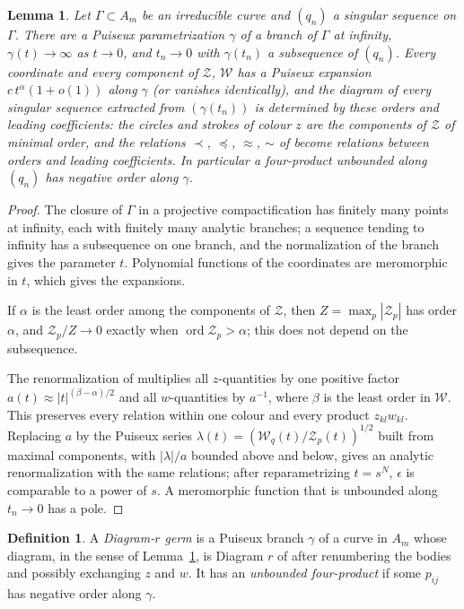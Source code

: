 \documentclass[11pt]{amsart}
\newtheorem{lemma}[theorem]{Lemma}
\theoremstyle{definition}
\newtheorem{definition}[theorem]{Definition}
\theoremstyle{remark}
\newcommand{\ord}{\operatorname{ord}}
\begin{document}
\begin{lemma}\label{lem:germ}
Let $\Gamma\subset A_m$ be an irreducible curve and $(q_n)$ a singular sequence on $\Gamma$.  There
are a Puiseux parametrization $\gamma$ of a branch of $\Gamma$ at infinity, $\gamma(t)\to\infty$ as
$t\to 0$, and $t_n\to0$ with $\gamma(t_n)$ a subsequence of $(q_n)$.  Every coordinate and every
component of $\mathcal Z$, $\mathcal W$ has a Puiseux expansion $c\,t^{\alpha}(1+o(1))$ along
$\gamma$ (or vanishes identically), and the diagram of every singular sequence extracted from
$(\gamma(t_n))$ is determined by these orders and leading coefficients: the circles and strokes
of colour $z$ are the components of $\mathcal Z$ of minimal order, and the relations $\prec$,
$\preccurlyeq$, $\approx$, $\sim$ of \cite[\S3]{AK} become relations between orders and leading
coefficients.  In particular a four-product unbounded along $(q_n)$ has negative order along
$\gamma$.
\end{lemma}

\begin{proof}
The closure of $\Gamma$ in a projective compactification has finitely many points at infinity,
each with finitely many analytic branches; a sequence tending to infinity has a subsequence on
one branch, and the normalization of the branch gives the parameter $t$.  Polynomial functions
of the coordinates are meromorphic in $t$, which gives the expansions.

If $\alpha$ is the least
order among the components of $\mathcal Z$, then $Z=\max_p|\mathcal Z_p|$ has order $\alpha$, and
$\mathcal Z_p/Z\to0$ exactly when $\ord\mathcal Z_p>\alpha$; this does not depend on the
subsequence.

The renormalization of \cite[p.~547]{AK} multiplies all $z$-quantities by one
positive factor $a(t)\approx|t|^{(\beta-\alpha)/2}$ and all $w$-quantities by $a^{-1}$, where
$\beta$ is the least order in $\mathcal W$.  This preserves every relation within one colour and
every product $z_{kl}w_{kl}$.  Replacing $a$ by the Puiseux series $\lambda(t)=(\mathcal W_q(t)/
\mathcal Z_p(t))^{1/2}$ built from maximal components, with $|\lambda|/a$ bounded above and
below, gives an analytic renormalization with the same relations; after reparametrizing
$t=s^N$, $\epsilon$ is comparable to a power of $s$.  A meromorphic function that is unbounded
along $t_n\to0$ has a pole.
\end{proof}

\begin{definition}\label{def:germ}
A \emph{Diagram-$r$ germ} is a Puiseux branch $\gamma$ of a curve in $A_m$ whose diagram, in the
sense of Lemma~\ref{lem:germ}, is Diagram $r$ of \cite[Fig.~11]{AK} after renumbering the bodies
and possibly exchanging $z$ and $w$.  It has an \emph{unbounded four-product} if some $p_{ij}$ has
negative order along $\gamma$.
\end{definition}
\end{document}
